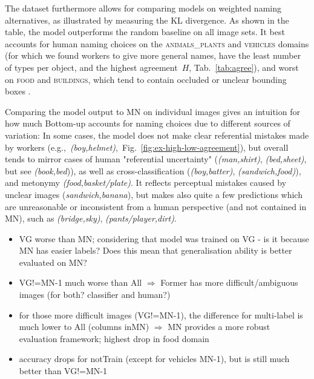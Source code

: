 The dataset furthermore allows for comparing models on weighted naming alternatives, as illustrated by measuring the KL divergence. 
As shown in the table, the model outperforms the random baseline on all image sets. 
It best accounts for human naming choices on the \textsc{animals\_plants} and \textsc{vehicles} domains (for which we found workers to give more general names, have the least number of types per object, and the highest agreement\ $H$, Tab.\ \ref{tab:agree}), and worst on \textsc{food} and \textsc{buildings}, which tend to contain occluded or unclear bounding boxes . 

Comparing the model output to MN on individual images gives an intuition for how much Bottom-up accounts for naming choices due to different sources of variation: 
In some cases, the model does not make clear referential mistakes made by workers (e.g.,\ \textsl{(boy,helmet)},\ Fig.\ \ref{fig:ex-high-low-agreement}), but overall tends to mirror  cases of human "referential uncertainty" 
(\textsl{(man,shirt)}, \textsl{(bed,sheet)}, but see \textsl{(book,bed})), as well as cross-classification (\textsl{(boy,batter)}, \textsl{(sandwich,food)}), and metonymy \textsl{(food,basket/plate)}. 
It reflects perceptual mistakes caused by unclear images (\textit{sandwich,banana}), but makes also quite a few predictions which are unreasonable or inconsistent from a human perspective (and not contained in MN), such as \textsl{(bridge,sky)}, \textsl{(pants/player,dirt)}. 

\iffalse
\begin{itemize}
	\item VG worse than MN; considering that model was trained on VG - is it because MN has easier labels? Does this mean that generalisation ability is better evaluated on MN?
	\item VG!=MN-1 much worse than All $\Rightarrow$ Former has more difficult/ambiguous images (for both? classifier and human?)
	\item for those more difficult images (VG!=MN-1), the difference for multi-label is much lower to All (columns inMN) $\Rightarrow$ MN provides a more robust evaluation framework; highest drop in food domain
	\item accuracy drops for notTrain (except for vehicles MN-1), but is still much better than VG!=MN-1  
\end{itemize}
 
